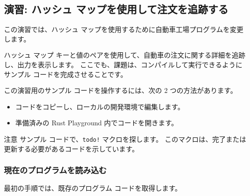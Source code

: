 \subsection{演習: ハッシュ マップを使用して注文を追跡する}

この演習では、ハッシュ マップを使用するために自動車工場プログラムを変更します。

ハッシュ マップ キーと値のペアを使用して、自動車の注文に関する詳細を追跡し、出力を表示します。 ここでも、課題は、コンパイルして実行できるようにサンプル コードを完成させることです。

この演習用のサンプル コードを操作するには、次の 2 つの方法があります。

\begin{itemize}
\item コードをコピーし、ローカルの開発環境で編集します。
\item 準備済みの Rust Playground 内でコードを開きます。
\end{itemize}

\begin{itembox}[l]{注意}
サンプル コードで、\texttt{todo!} マクロを探します。 このマクロは、完了または更新する必要があるコードを示しています。
\end{itembox}

\subsubsection{現在のプログラムを読み込む}

最初の手順では、既存のプログラム コードを取得します。

